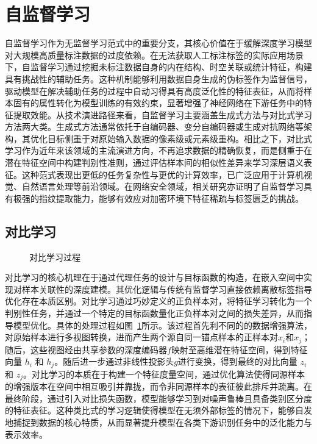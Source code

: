 \section{自监督学习}
自监督学习作为无监督学习范式中的重要分支，其核心价值在于缓解深度学习模型对大规模高质量标注数据的过度依赖。在无法获取人工标注标签的实际应用场景下，自监督学习通过挖掘未标注数据自身的内在结构、时空关联或统计特征，构建具有挑战性的辅助任务。这种机制能够利用数据自身生成的伪标签作为监督信号，驱动模型在解决辅助任务的过程中自动习得具有高度泛化性的特征表征，从而将样本固有的属性转化为模型训练的有效约束，显著增强了神经网络在下游任务中的特征提取效能\cite{jaiswal2020survey}。从技术演进路径来看，自监督学习主要涵盖生成式方法与对比式学习方法两大类\cite{liu2021self}。生成式方法通常依托于自编码器、变分自编码器或生成对抗网络等架构，其优化目标侧重于对原始输入数据的像素级或元素级重构。相比之下，对比式学习作为近年来该领域的主流演进方向，不再追求数据的精确恢复，而是侧重于在潜在特征空间中构建判别性准则，通过评估样本间的相似性差异来学习深层语义表征。这种范式表现出更低的任务复杂性与更优的计算效率，已广泛应用于计算机视觉、自然语言处理等前沿领域。在网络安全领域，相关研究亦证明了自监督学习具有极强的指纹提取能力，能够有效应对加密环境下特征稀疏与标签匮乏的挑战\cite{zhan2023toward}。

\subsection{对比学习}
\begin{figure}[ht]
  \centering
  \caption{对比学习过程}
  \label{fig:contrastive}
\end{figure}
对比学习的核心机理在于通过代理任务的设计与目标函数的构造，在嵌入空间中实现对样本关联性的深度建模。其优化逻辑与传统有监督学习直接依赖离散标签指导优化存在本质区别\cite{yao2021self}。对比学习通过巧妙定义的正负样本对，将特征学习转化为一个判别性任务，并通过一个特定的目标函数量化正负样本对之间的损失差异，从而指导模型优化\cite{he2020momentum}。具体的处理过程如图~\ref{fig:contrastive}所示。该过程首先利不同的的数据增强算法，对原始样本进行多视图转换，进而产生两个源自同一锚点样本的正样本对$x_i$和$x_j$；随后，这些视图经由共享参数的深度编码器$f$映射至高维潜在特征空间，得到特征向量 $h_i$ 和 $h_j$。随后进一步通过非线性投影头$g$进行变换，得到最终的对比向量 $z_i$ 和 $z_j$。对比学习的本质在于构建一个特征度量空间，通过优化算法使得同源样本的增强版本在空间中相互吸引并靠拢，而令非同源样本的表征彼此排斥并疏离。在最终阶段，通过引入对比损失函数，模型能够学习到对噪声鲁棒且具备类别区分度的特征表征。这种类比式的学习逻辑使得模型在无须外部标签的情况下，能够自发地捕捉到数据的核心特质，从而显著提升模型在各类下游识别任务中的泛化能力与表示效率。

